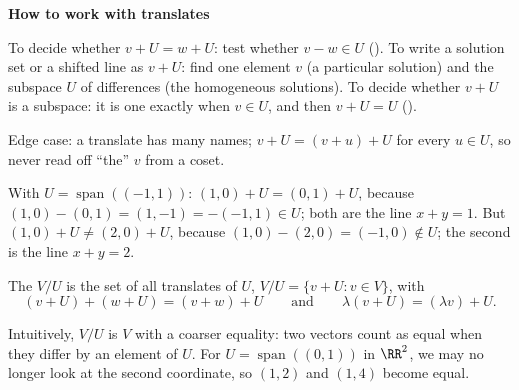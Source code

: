 \documentclass[10pt]{scrartcl}
\DeclareMathOperator{\spn}{span}\DeclareMathOperator{\nul}{null}\DeclareMathOperator{\range}{range}
\newenvironment{methodbox}[1]{\begin{mdframed}[style=methodstyle]\textbf{\color{NavyBlue}#1}\par\vspace{2pt}}{\end{mdframed}}
\begin{document}
\begin{methodbox}{How to work with translates}
  \begin{steps}
    \ii To decide whether $v+U=w+U$: test whether $v-w\in U$ ().
    \ii To write a solution set or a shifted line as $v+U$: find one element $v$ (a particular solution) and the subspace $U$ of differences (the homogeneous solutions).
    \ii To decide whether $v+U$ is a subspace: it is one exactly when $v\in U$, and then $v+U=U$ ().
  \end{steps}
  Edge case: a translate has many names; $v+U=(v+u)+U$ for every $u\in U$, so never read off ``the'' $v$ from a coset.
\end{methodbox}

\begin{example*}
  With $U=\spn((-1,1))$: $(1,0)+U=(0,1)+U$, because $(1,0)-(0,1)=(1,-1)=-(-1,1)\in U$; both are the line $x+y=1$. But $(1,0)+U\ne(2,0)+U$, because $(1,0)-(2,0)=(-1,0)\notin U$; the second is the line $x+y=2$.
\end{example*}

\begin{definition*}
  The  $V/U$ is the set of all translates of $U$, $V/U=\{v+U:v\in V\}$, with
  \[
    (v+U) + (w+U) = (v+w) + U \qquad\text{and}\qquad \lambda(v+U) = (\lambda v) + U .
  \]
\end{definition*}

Intuitively, $V/U$ is $V$ with a coarser equality: two vectors count as equal when they differ by an element of $U$. For $U=\spn((0,1))$ in $\RR^2$, we may no longer look at the second coordinate, so $(1,2)$ and $(1,4)$ become equal.
\end{document}
